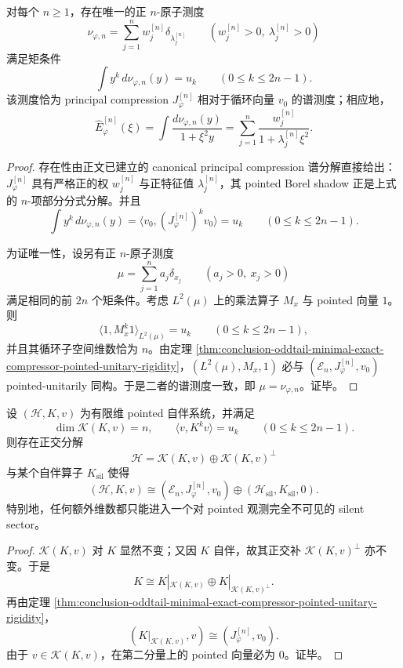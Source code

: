 \begin{theorem}\label{thm:conclusion-oddtail-canonical-n-atomic-quadrature-shadow-uniqueness}
对每个 \(n\ge 1\)，存在唯一的正 \(n\)-原子测度
\[
\nu_{\varphi,n}=\sum_{j=1}^{n} w_j^{[n]}\delta_{\lambda_j^{[n]}}
\qquad
(w_j^{[n]}>0,\ \lambda_j^{[n]}>0)
\]
满足矩条件
\[
\int y^k\,d\nu_{\varphi,n}(y)=u_k
\qquad (0\le k\le 2n-1).
\]
该测度恰为 principal compression \(J_\varphi^{[n]}\) 相对于循环向量 \(v_0\) 的谱测度；相应地，
\[
\widehat E_\varphi^{[n]}(\xi)
=
\int \frac{d\nu_{\varphi,n}(y)}{1+\xi^2y}
=
\sum_{j=1}^{n}\frac{w_j^{[n]}}{1+\lambda_j^{[n]}\xi^2}.
\]
\end{theorem}
\begin{proof}
存在性由正文已建立的 canonical principal compression 谱分解直接给出：\(J_\varphi^{[n]}\) 具有严格正的权 \(w_j^{[n]}\) 与正特征值 \(\lambda_j^{[n]}\)，其 pointed Borel shadow 正是上式的 \(n\)-项部分分式分解。并且
\[
\int y^k\,d\nu_{\varphi,n}(y)
=
\langle v_0,(J_\varphi^{[n]})^k v_0\rangle
=
u_k
\qquad (0\le k\le 2n-1).
\]

为证唯一性，设另有正 \(n\)-原子测度
\[
\mu=\sum_{j=1}^{n}a_j\delta_{x_j}
\qquad (a_j>0,\ x_j>0)
\]
满足相同的前 \(2n\) 个矩条件。考虑 \(L^2(\mu)\) 上的乘法算子 \(M_x\) 与 pointed 向量 \(1\)。则
\[
\langle 1,M_x^k1\rangle_{L^2(\mu)}=u_k
\qquad (0\le k\le 2n-1),
\]
并且其循环子空间维数恰为 \(n\)。由定理 \ref{thm:conclusion-oddtail-minimal-exact-compressor-pointed-unitary-rigidity}，\((L^2(\mu),M_x,1)\) 必与 \((\mathcal E_n,J_\varphi^{[n]},v_0)\) pointed-unitarily 同构。于是二者的谱测度一致，即 \(\mu=\nu_{\varphi,n}\)。证毕。
\end{proof}

\begin{proposition}\label{prop:conclusion-oddtail-finite-pointed-host-silent-sector}
设 \((\mathcal H,K,v)\) 为有限维 pointed 自伴系统，并满足
\[
\dim \mathcal K(K,v)=n,
\qquad
\langle v,K^k v\rangle=u_k
\qquad (0\le k\le 2n-1).
\]
则存在正交分解
\[
\mathcal H=\mathcal K(K,v)\oplus \mathcal K(K,v)^\perp
\]
与某个自伴算子 \(K_{\mathrm{sil}}\) 使得
\[
(\mathcal H,K,v)
\cong
(\mathcal E_n,J_\varphi^{[n]},v_0)\oplus
(\mathcal H_{\mathrm{sil}},K_{\mathrm{sil}},0).
\]
特别地，任何额外维数都只能进入一个对 pointed 观测完全不可见的 silent sector。
\end{proposition}
\begin{proof}
\(\mathcal K(K,v)\) 对 \(K\) 显然不变；又因 \(K\) 自伴，故其正交补 \(\mathcal K(K,v)^\perp\) 亦不变。于是
\[
K\cong K|_{\mathcal K(K,v)}\oplus K|_{\mathcal K(K,v)^\perp}.
\]
再由定理 \ref{thm:conclusion-oddtail-minimal-exact-compressor-pointed-unitary-rigidity}，
\[
(K|_{\mathcal K(K,v)},v)\cong (J_\varphi^{[n]},v_0).
\]
由于 \(v\in \mathcal K(K,v)\)，在第二分量上的 pointed 向量必为 \(0\)。证毕。
\end{proof}

